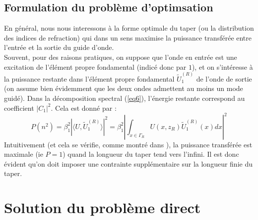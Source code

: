 \documentclass{article}
\begin{document}
\subsection{Formulation du problème d'optimsation}
En général, nous nous interessons à la forme optimale du taper (ou la distribution des indices de refraction) qui dans un sens maximise la puissance transférée entre l'entrée et la sortie du guide d'onde.\\
Souvent, pour des raisons pratiques, on suppose que l'onde en entrée est une excitation de l'élément propre fondamental (indicé donc par $1$), et on s'intéresse à la puissance restante dans l'élément propre fondamental $\tilde{U}^{(R)}_1$ de l'onde de sortie (on assume bien évidemment que les deux ondes admettent au moins un mode guidé). Dans la décomposition spectral (\ref{eq6}), l'énergie restante correspond au coefficient $|C_1|^2$. Cela est donné par :
\begin{equation}\label{eq11} P(n^2)=\beta_1^2|\langle U,\tilde{U}_1^{(R)}\rangle|^2=\beta_1^2\left|\int_{x\in\Gamma_R} U(x,z_R)\tilde{U}_1^{(R)}(x)dx\right|^2\end{equation}
Intuitivement (et cela se vérifie, comme montré dans \cite{Snyd}), la puissance transférée est maximale (ie $P=1$) quand la longueur du taper tend vers l'infini. Il est donc évident qu'on doit imposer une contrainte supplémentaire sur la longueur finie du taper.

\section{Solution du problème direct}
\end{document}

